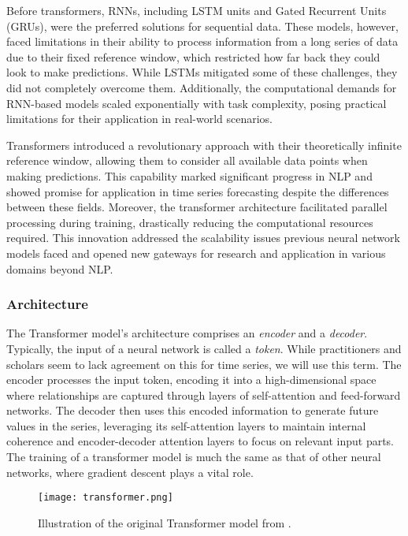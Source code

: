 \documentclass[12pt,a4paper]{article}
\begin{document}
Before transformers, RNNs, including LSTM units and Gated Recurrent Units (GRUs), were the preferred solutions for sequential data. These models, however, faced limitations in their ability to process information from a long series of data due to their fixed reference window, which restricted how far back they could look to make predictions. While LSTMs mitigated some of these challenges, they did not completely overcome them. Additionally, the computational demands for RNN-based models scaled exponentially with task complexity, posing practical limitations for their application in real-world scenarios.

Transformers introduced a revolutionary approach with their theoretically infinite reference window, allowing them to consider all available data points when making predictions. This capability marked significant progress in NLP and showed promise for application in time series forecasting despite the differences between these fields. Moreover, the transformer architecture facilitated parallel processing during training, drastically reducing the computational resources required. This innovation addressed the scalability issues previous neural network models faced and opened new gateways for research and application in various domains beyond NLP. 

\subsubsection{Architecture}
The Transformer model’s architecture comprises an \textit{encoder} and a \textit{decoder}. Typically, the input of a neural network is called a \textit{token}. While practitioners and scholars seem to lack agreement on this for time series, we will use this term. The encoder processes the input token, encoding it into a high-dimensional space where relationships are captured through layers of self-attention and feed-forward networks. The decoder then uses this encoded information to generate future values in the series, leveraging its self-attention layers to maintain internal coherence and encoder-decoder attention layers to focus on relevant input parts. The training of a transformer model is much the same as that of other neural networks, where gradient descent plays a vital role. 

\begin{figure}[htbp]
  \centering
  \texttt{[image: transformer.png]}
  \caption{Illustration of the original Transformer model from \cite{Vaswani2017}.}
  \label{transformer}
\end{figure}
\end{document}
